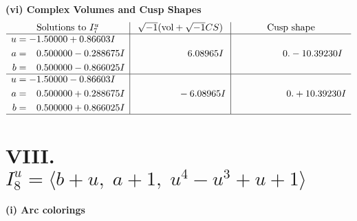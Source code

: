 \documentclass[1p]{elsarticle_modified}
\theoremstyle{definition}
\newcommand{\I}{\sqrt{-1}}
\begin{document}
\newpage\flushleft \textbf{(vi) Complex Volumes and Cusp Shapes}
$$\begin{array}{c|c|c}  
\text{Solutions to }I^u_{7}& \I (\text{vol} + \sqrt{-1}CS) & \text{Cusp shape}\\
 \hline 
\begin{aligned}
u &= -1.50000 + 0.86603 I \\
a &= \phantom{-}0.500000 - 0.288675 I \\
b &= \phantom{-}0.500000 - 0.866025 I\end{aligned}
 & \phantom{-0.000000 -}6.08965 I & \phantom{-0.000000 } 0. - 10.39230 I \\ \hline\begin{aligned}
u &= -1.50000 - 0.86603 I \\
a &= \phantom{-}0.500000 + 0.288675 I \\
b &= \phantom{-}0.500000 + 0.866025 I\end{aligned}
 & \phantom{-0.000000 } -6.08965 I & \phantom{-0.000000 -}0. + 10.39230 I\\
 \hline 
 \end{array}$$\newpage\newpage\renewcommand{\arraystretch}{1}
\centering \section*{VIII. $I^u_{8}= \langle b+u,\;a+1,\;u^4- u^3+u+1 \rangle$}
\flushleft \textbf{(i) Arc colorings}\\
\end{document}
